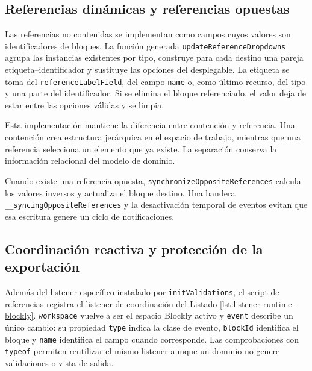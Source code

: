 \subsection{Referencias dinámicas y referencias opuestas}

Las referencias no contenidas se implementan como campos cuyos valores son
identificadores de bloques. La función generada
\texttt{updateReferenceDropdowns} agrupa las instancias existentes por tipo,
construye para cada destino una pareja etiqueta--identificador y sustituye las
opciones del desplegable. La etiqueta se toma del
\texttt{referenceLabelField}, del campo \texttt{name} o, como último recurso,
del tipo y una parte del identificador. Si se elimina el bloque referenciado, el
valor deja de estar entre las opciones válidas y se limpia.

Esta implementación mantiene la diferencia entre contención y referencia. Una
contención crea estructura jerárquica en el espacio de trabajo, mientras que una
referencia selecciona un elemento que ya existe. La separación conserva la
información relacional del modelo de dominio.

Cuando existe una referencia opuesta, \texttt{synchronizeOppositeReferences}
calcula los valores inversos y actualiza el bloque destino. Una bandera
\texttt{\_\_syncingOpposite}\allowbreak\texttt{References} y la desactivación temporal de eventos
evitan que esa escritura genere un ciclo de notificaciones.

\subsection{Coordinación reactiva y protección de la exportación}

Además del listener específico instalado por \texttt{initValidations}, el
script de referencias registra el listener de coordinación del Listado
\ref{lst:listener-runtime-blockly}. \texttt{workspace} vuelve a ser el espacio
Blockly activo y \texttt{event} describe un único cambio: su propiedad
\texttt{type} indica la clase de evento, \texttt{blockId} identifica el bloque
y \texttt{name} identifica el campo cuando corresponde. Las comprobaciones
con \texttt{typeof} permiten reutilizar el mismo listener aunque un dominio no
genere validaciones o vista de salida.

